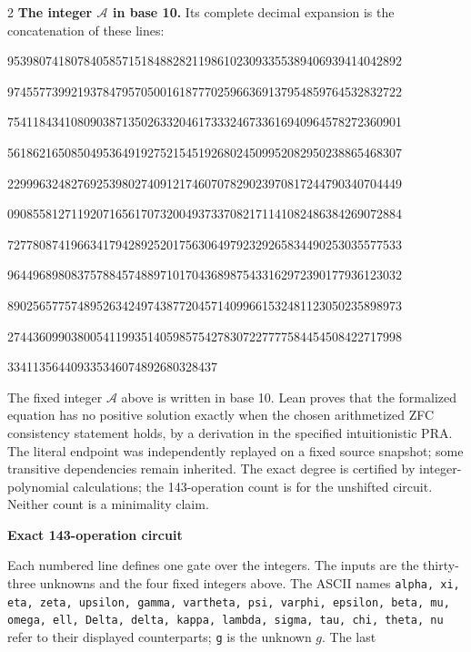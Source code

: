 \documentclass[10pt]{article}
\begin{document}
\begin{multicols}{2}
\textbf{The integer $\mathcal A$ in base 10.}
Its complete decimal expansion is the concatenation of these lines:\par
\begingroup\fontsize{7.7}{8.2}\selectfont{}\par
95398074180784058571518488282119861023093355389406939414042892\par
97455773992193784795705001618777025966369137954859764532832722\par
75411843410809038713502633204617333246733616940964578272360901\par
56186216508504953649192752154519268024509952082950238865468307\par
22999632482769253980274091217460707829023970817244790340704449\par
09085581271192071656170732004937337082171141082486384269072884\par
72778087419663417942892520175630649792329265834490253035577533\par
96449689808375788457488971017043689875433162972390177936123032\par
89025657757489526342497438772045714099661532481123050235898973\par
27443609903800541199351405985754278307227777584454508422717998\par
334113564409335346074892680328437\par
\endgroup
\normalfont\fontsize{7.7}{8.2}\selectfont
The fixed integer $\mathcal A$ above is written in base 10. Lean proves that the formalized equation has no positive solution exactly
when the chosen arithmetized ZFC consistency statement holds, by a derivation
in the specified intuitionistic PRA. The literal endpoint was independently
replayed on a fixed source snapshot; some transitive dependencies remain
inherited. The exact degree is certified by integer-polynomial calculations;
the 143-operation count is for the unshifted circuit. Neither count is a
minimality claim.
\end{multicols}
\clearpage
\begin{center}{\large\bfseries Exact 143-operation circuit}\end{center}
Each numbered line defines one gate over the integers. The inputs are the
thirty-three unknowns and the four fixed integers above. The ASCII names
\texttt{alpha, xi, eta, zeta, upsilon, gamma, vartheta, psi, varphi, epsilon, beta, mu, omega, ell, Delta, delta, kappa, lambda, sigma, tau, chi, theta, nu}
refer to their displayed counterparts; \texttt{g} is the unknown $g$. The last
\end{document}

